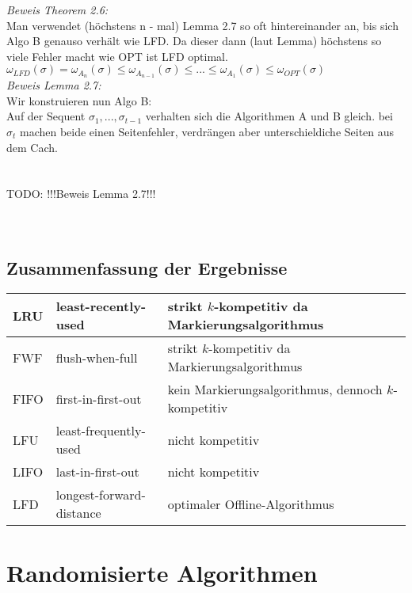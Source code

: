 \textit{Beweis Theorem 2.6:}\\
Man verwendet (höchstens n - mal) Lemma 2.7 so oft hintereinander an, bis sich Algo B genauso verhält wie LFD. Da dieser dann (laut Lemma) höchstens so viele Fehler macht wie OPT ist LFD optimal.\\
$\omega_{LFD}(\sigma) = \omega_{A_{n}}(\sigma) \le \omega_{A_{n-1}}(\sigma) \le ... \le \omega_{A_{1}}(\sigma) \le \omega_{OPT}(\sigma)$ \\

\textit{Beweis Lemma 2.7:}\\
Wir konstruieren nun Algo B: \\
Auf der Sequent $\sigma_{1}, ..., \sigma_{t-1}$ verhalten sich die Algorithmen A und B gleich. bei $\sigma_{t}$ machen beide einen Seitenfehler, verdrängen aber unterschieldiche Seiten aus dem Cach.
\\
\\
\\
TODO: !!!Beweis Lemma 2.7!!!
\\
\\
\\

\subsection{Zusammenfassung der Ergebnisse}

\begin{tabular}{| l | l | l |}
\hline
LRU  & least-recently-used      & strikt $k$-kompetitiv da Markierungsalgorithmus \\ \hline
FWF  & flush-when-full          & strikt $k$-kompetitiv da Markierungsalgorithmus \\ \hline
FIFO & first-in-first-out       & kein Markierungsalgorithmus, dennoch $k$-kompetitiv \\ \hline
LFU  & least-frequently-used    & nicht kompetitiv\\ \hline
LIFO & last-in-first-out        & nicht kompetitiv\\ \hline
LFD  & longest-forward-distance & optimaler Offline-Algorithmus \\ \hline
\end{tabular}



\section{Randomisierte Algorithmen}


